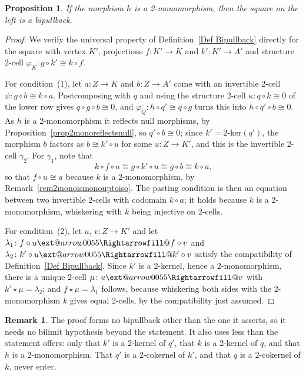 \documentclass[reqno,a4paper]{amsart}
\makeatletter
\numberwithin{equation}{section}
\theoremstyle{plain}
\newtheorem{proposition}[subsection]{Proposition}
\theoremstyle{definition}
\newtheorem{remark}[subsection]{Remark}
\def\nameit#1{\textrm{#1}~}
\def\prox{\nameit{Proposition}}
\def\defx{\nameit{Definition}}
\def\remx{\nameit{Remark}}
\newcommand{\comp}{\circ}
\newcommand{\iso}{\cong}
\def\phi{\varphi}
\renewcommand{\1}{\onecat{1}}
\newcommand{\twoker}{\ensuremath{2\text{-}\mathrm{ker}}}
\newcommand{\aR}[2][]{%
	\ext@arrow 0055{\Rightarrowfill@}{#1}{#2}}
\makeatother
\begin{document}
\begin{proposition}\label{Mono Implies Left Pullback}
	If the morphism \(h\) is a 2-monomorphism, then the square on the left is a bipullback.
\end{proposition}
\begin{proof}
	We verify the universal property of \defx\ref{Def Bipullback} directly for the square with vertex \(K'\), projections \(f\colon K'\to K\) and \(k'\colon K'\to A'\) and structure 2-cell \(\phi_K\colon g\comp k'\iso k\comp f\).

	For condition~(1), let \(a\colon Z\to K\) and \(b\colon Z\to A'\) come with an invertible 2-cell \(\psi\colon g\comp b\iso k\comp a\). Postcomposing with \(q\) and using the structure 2-cell \(\kappa\colon q\comp k\iso 0\) of the lower row gives \(q\comp g\comp b\iso 0\), and \(\phi_Q\colon h\comp q'\iso q\comp g\) turns this into \(h\comp q'\comp b\iso 0\). As \(h\) is a 2-monomorphism it reflects null morphisms, by \prox\ref{prop2monoreflectsnull}, so \(q'\comp b\iso 0\); since \(k'=\twoker(q')\), the morphism \(b\) factors as \(b\iso k'\comp u\) for some \(u\colon Z\to K'\), and this is the invertible 2-cell \(\gamma_2\). For \(\gamma_1\), note that
	\[
		k\comp f\comp u\iso g\comp k'\comp u\iso g\comp b\iso k\comp a\text{,}
	\]
	so that \(f\comp u\iso a\) because \(k\) is a 2-monomorphism, by \remx\ref{rem2monoismonouptoiso}. The pasting condition is then an equation between two invertible 2-cells with codomain \(k\comp a\); it holds because \(k\) is a 2-monomorphism, whiskering with \(k\) being injective on 2-cells.

	For condition~(2), let \(u\), \(v\colon Z\to K'\) and let \(\lambda_1\colon f\comp u\aR{}f\comp v\) and \(\lambda_2\colon k'\comp u\aR{}k'\comp v\) satisfy the compatibility of \defx\ref{Def Bipullback}. Since \(k'\) is a 2-kernel, hence a 2-monomorphism, there is a unique 2-cell \(\mu\colon u\aR{}v\) with \(k'\star\mu=\lambda_2\); and \(f\star\mu=\lambda_1\) follows, because whiskering both sides with the 2-monomorphism \(k\) gives equal 2-cells, by the compatibility just assumed.
\end{proof}

\begin{remark}\label{Rem Left Pullback Cost}
	The proof forms no bipullback other than the one it asserts, so it needs no bilimit hypothesis beyond the statement. It also uses less than the statement offers: only that \(k'\) is a 2-kernel of \(q'\), that \(k\) is a 2-kernel of \(q\), and that \(h\) is a 2-monomorphism. That \(q'\) is a 2-cokernel of \(k'\), and that \(q\) is a 2-cokernel of \(k\), never enter.
\end{remark}
\end{document}
